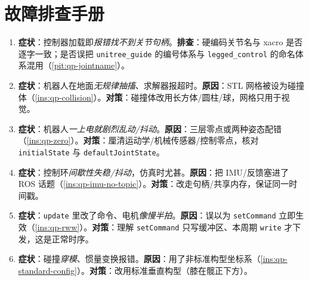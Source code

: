 \section*{故障排查手册}
\begin{enumerate}
  \item \textbf{症状}：控制器加载即\emph{报错找不到关节句柄}。\textbf{排查}：硬编码关节名与 xacro 是否逐字一致；是否误把 \texttt{unitree\_guide} 的编号体系与 \texttt{legged\_control} 的命名体系混用（\cref{pit:qp-jointname}）。
  \item \textbf{症状}：机器人在地面\emph{无规律抽搐}、求解器报超时。\textbf{原因}：STL 网格被设为碰撞体（\cref{ins:qp-collision}）。\textbf{对策}：碰撞体改用长方体/圆柱/球，网格只用于视觉。
  \item \textbf{症状}：机器人\emph{一上电就剧烈乱动/抖动}。\textbf{原因}：三层零点或两种姿态配错（\cref{ins:qp-zero}）。\textbf{对策}：厘清运动学/机械传感器/控制零点，核对 \texttt{initialState} 与 \texttt{defaultJointState}。
  \item \textbf{症状}：控制环\emph{间歇性失稳/抖动}，仿真时尤甚。\textbf{原因}：把 IMU/反馈塞进了 ROS 话题（\cref{ins:qp-imu-no-topic}）。\textbf{对策}：改走句柄/共享内存，保证同一时间戳。
  \item \textbf{症状}：\texttt{update} 里改了命令、电机\emph{像慢半拍}。\textbf{原因}：误以为 \texttt{setCommand} 立即生效（\cref{ins:qp-rww}）。\textbf{对策}：理解 \texttt{setCommand} 只写缓冲区、本周期 \texttt{write} 才下发，这是正常时序。
  \item \textbf{症状}：碰撞\emph{穿模}、惯量变换报错。\textbf{原因}：用了非标准构型坐标系（\cref{ins:qp-standard-config}）。\textbf{对策}：改用标准垂直构型（膝在髋正下方）。
\end{enumerate}
